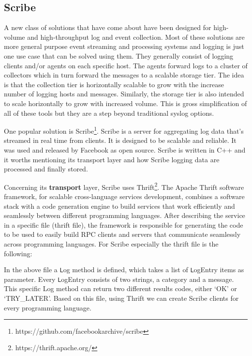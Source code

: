 \subsection{Scribe}
A new class of solutions that have come about have been designed for high-volume
and high-throughput log and event collection. Most of these solutions are more
general purpose event streaming and processing systems and logging is just one
use case that can be solved using them. They generally consist of logging
clients and/or agents on each specific host. The agents forward logs to a
cluster of collectors which in turn forward the messages to a scalable storage
tier. The idea is that the collection tier is horizontally scalable to grow with
the increase number of logging hosts and messages. Similarly, the storage tier
is also intended to scale horizontally to grow with increased volume. This is
gross simplification of all of these tools but they are a step beyond
traditional syslog options.

One popular solution is
Scribe\footnote{https://github.com/facebookarchive/scribe}. Scribe is a server
for aggregating log data that's streamed in real time from clients. It is
designed to be scalable and reliable.  It was used and released by Facebook as
open source. Scribe is written in C++ and it worths mentioning its transport
layer and how Scribe logging data are processed and finally stored.

Concerning its \textbf{transport} layer, Scribe uses
Thrift\footnote{https://thrift.apache.org/}. The Apache Thrift software
framework, for scalable cross-language services development, combines a software
stack with a code generation engine to build services that work efficiently and
seamlessly between different programming languages. After describing the service
in a specific file (thrift file), the framework is  responsible for generating
the code to be used to easily build RPC clients and servers that communicate
seamlessly across programming languages. For Scribe especially the thrift file
is the following:  


In the above file a \texttt Log method is defined, which takes a list of
\texttt LogEntry items as parameter. Every \texttt LogEntry consists of two
strings, a category and a message. This specific Log method can return two
different results codes, either `OK' or `TRY\_LATER'. Based on this file, using
Thrift we can create Scribe clients for every programming language.

